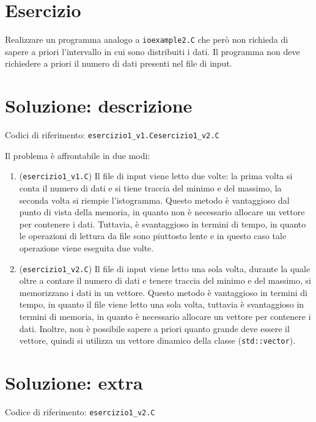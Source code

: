 \documentclass[10pt]{article}
\newcommand{\ttt}{\texttt}
\begin{document}
\newpage

\section{Esercizio}

Realizzare un programma analogo a \ttt{ioexample2.C} che però non richieda di sapere a priori l'intervallo in cui sono distribuiti i dati.
Il programma non deve richiedere a priori il numero di dati presenti nel file di input.

\section{Soluzione: descrizione}
Codici di riferimento: \ttt{esercizio1\_v1.C}\hspace{10pt}\ttt{esercizio1\_v2.C} \vspace{10pt}

Il problema è affrontabile in due modi:
\begin{enumerate}
    \item (\ttt{esercizio1\_v1.C}) Il file di input viene letto due volte: la prima volta si conta il numero di dati e si tiene traccia del minimo e del massimo, la seconda volta si riempie l'istogramma.
        Questo metodo è vantaggioso dal punto di vista della memoria, in quanto non è necessario allocare un vettore per contenere i dati.
        Tuttavia, è svantaggioso in termini di tempo, in quanto le operazioni di lettura da file sono piuttosto lente e in questo caso tale operazione viene eseguita due volte.
    \item (\ttt{esercizio1\_v2.C}) Il file di input viene letto una sola volta, durante la quale oltre a contare il numero di dati e tenere traccia del minimo e del massimo, si memorizzano i dati in un vettore.
        Questo metodo è vantaggioso in termini di tempo, in quanto il file viene letto una sola volta, tuttavia è svantaggioso in termini di memoria, in quanto è necessario allocare un vettore per contenere i dati.
        Inoltre, non è possibile sapere a priori quanto grande deve essere il vettore, quindi si utilizza un vettore dinamico della classe (\ttt{std::vector}).
\end{enumerate}

\section{Soluzione: extra}
Codice di riferimento: \ttt{esercizio1\_v2.C} \vspace{10pt}
\end{document}
